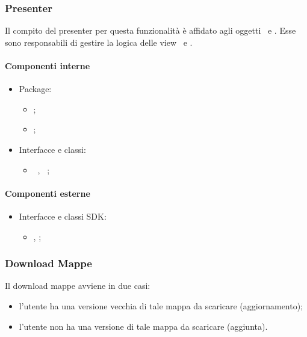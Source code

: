 \documentclass[../Funzionalita.tex]{subfiles}
\begin{document}
		\newpage
		\subsubsection{Presenter}
			Il compito del presenter per questa funzionalità è affidato agli oggetti \LocalMapActivity\ e \RemoteMapManagerActivity. Esse sono responsabili di gestire la logica delle view \LocalMapManagerView\ e \RemoteMapManagerView.
	
			\paragraph*{Componenti interne}
			\begin{itemize}
			
				\item Package:
				\begin{itemize}
					\item[] \view;
					\item[] \presenter;
				\end{itemize}
				
				\item Interfacce e classi:
				\begin{itemize}
					\item[] \LocalMapActivity\, \RemoteMapManagerActivity, \LocalMapManagerView\, \RemoteMapManagerView;
				\end{itemize}
				
			\end{itemize}
			
			
			\paragraph*{Componenti esterne}
			
			\begin{itemize}
				\item Interfacce e classi SDK:
				\begin{itemize}
					\item[] \Activity, \AppCompatActivity;
				\end{itemize}
			\end{itemize}
			
			
		\newpage
		\subsubsection{Download Mappe}
			Il download mappe avviene in due casi:
			\begin{itemize}
				\item l'utente ha una versione vecchia di tale mappa da scaricare (aggiornamento);
				\item l'utente non ha una versione di tale mappa da scaricare (aggiunta).
			\end{itemize}
			
\end{document}
